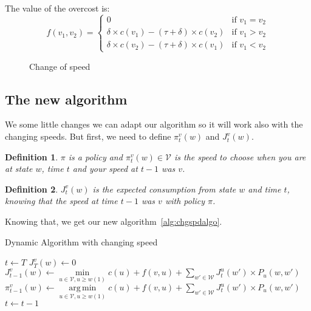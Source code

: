 \documentclass[
10pt, %
a4paper, %
oneside, %
headinclude,footinclude, %
BCOR5mm, %
]{scrartcl}
\DeclareMathOperator*{\argmin}{arg\,min}
\newcommand{\V}{\mathcal{V}}
\newcommand{\W}{\mathcal{W}}
\newtheorem{defi}{Definition}
\begin{document}
The value of the overcost is:
\begin{equation}
  \label{eq:overcost}
  f(v_1,v_2)=
  \begin{cases}
    0 & \mbox{if } v_1=v_2 \\
    \delta\times c(v_1) - (\tau + \delta)\times c(v_2) & \mbox{if }
    v_1>v_2 \\
    \delta\times c(v_2) - (\tau + \delta)\times c(v_1) & \mbox{if }
    v_1<v_2
  \end{cases}
\end{equation}

\begin{figure}
  \centering
  \caption{Change of speed}
  \label{fig:overcost}
\end{figure}

\subsection{The new algorithm}
We some little changes we can adapt our algorithm so it will work also
with the changing speeds. But first, we need to define $\pi_t^v(w)$ and
$J_t^v(w)$.\\

\begin{defi}
  $\pi$ is a policy and $\pi_t^v(w)\in\V$ is the speed to choose when
  you are at state $w$, time $t$ and your speed at $t-1$ was $v$.
\end{defi}

\begin{defi}
  $J_t^v(w)$ is the expected consumption from state $w$ and time $t$,
  knowing that the speed at time $t-1$ was $v$ with policy $\pi$.
\end{defi}

Knowing that, we get our new algorithm~\ref{alg:chgspdalgo}.

\begin{algorithm}
  \caption{Dynamic Algorithm with changing speed}
  \label{alg:chgspdalgo}  
  \begin{algorithmic}
    \STATE $t\leftarrow T$
    \FORALL{$w\in\W,v\in\V$}
    \STATE $J_T^v(w)\leftarrow0$
    \ENDFOR
    \FORALL{$w\in\W,v\in\V$}
    \STATE $J_{t-1}^v(w)\leftarrow \min\limits_{u\in\V,u\geq w(1)}
    c(u)+f(v,u)+\sum\limits_{w'\in\W}J_t^u(w')\times P_u(w,w')$
    \STATE $\pi_{t-1}^v(w)\leftarrow \argmin\limits_{u\in\V,u\geq w(1)}
    c(u)+f(v,u)+\sum\limits_{w'\in\W}J_t^u(w')\times P_u(w,w')$    
    \ENDFOR
    \STATE $t\leftarrow t-1$
    \ENDWHILE
  \end{algorithmic}
\end{algorithm}
\end{document}

